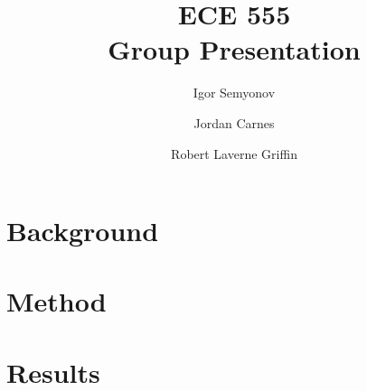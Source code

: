 \documentclass[12pt]{article}
\title{ECE 555 \\ Group Presentation}
\author[1]{Igor Semyonov}
\author[1]{Jordan Carnes}
\author[1]{Robert Laverne Griffin}
\affil[1]{George Macon University, Department of Electrical and Computer Engineering}
\begin{document}
\maketitle

\tableofcontents
\listoffigures
\listoftables
\lstlistoflistings

\section{Background}
\section{Method}
\section{Results}
\end{document}
